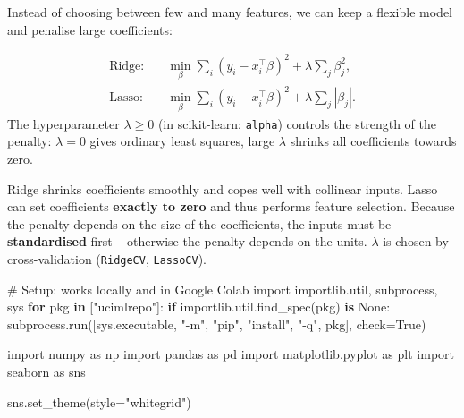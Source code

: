 \documentclass[
  letterpaper,
  DIV=11,
  numbers=noendperiod]{scrreprt}
\newenvironment{Shaded}{\begin{snugshade}}{\end{snugshade}}
\newcommand{\CommentTok}[1]{\textcolor[rgb]{0.37,0.37,0.37}{#1}}
\newcommand{\ControlFlowTok}[1]{\textcolor[rgb]{0.00,0.23,0.31}{\textbf{#1}}}
\newcommand{\ImportTok}[1]{\textcolor[rgb]{0.00,0.46,0.62}{#1}}
\newcommand{\KeywordTok}[1]{\textcolor[rgb]{0.00,0.23,0.31}{\textbf{#1}}}
\newcommand{\NormalTok}[1]{\textcolor[rgb]{0.00,0.23,0.31}{#1}}
\newcommand{\OperatorTok}[1]{\textcolor[rgb]{0.37,0.37,0.37}{#1}}
\newcommand{\StringTok}[1]{\textcolor[rgb]{0.13,0.47,0.30}{#1}}
\newcommand{\VariableTok}[1]{\textcolor[rgb]{0.07,0.07,0.07}{#1}}
\begin{document}
Instead of choosing between few and many features, we can keep a
flexible model and penalise large coefficients:

\begin{tcolorbox}[enhanced jigsaw, left=2mm, title=\textcolor{quarto-callout-note-color}{\faInfo}\hspace{0.5em}{Definition: Ridge and Lasso regression}, opacityback=0, breakable, rightrule=.15mm, arc=.35mm, toptitle=1mm, colbacktitle=quarto-callout-note-color!10!white, opacitybacktitle=0.6, coltitle=black, colframe=quarto-callout-note-color-frame, bottomrule=.15mm, leftrule=.75mm, bottomtitle=1mm, titlerule=0mm, toprule=.15mm, colback=white]

\[\begin{aligned} \text{Ridge:}&\quad \min_\beta \sum_i (y_i - x_i^\top\beta)^2 + \lambda \sum_j \beta_j^2, \\ \text{Lasso:}&\quad \min_\beta \sum_i (y_i - x_i^\top\beta)^2 + \lambda \sum_j |\beta_j|. \end{aligned}\]
The hyperparameter \(\lambda \ge 0\) (in scikit-learn: \texttt{alpha})
controls the strength of the penalty: \(\lambda = 0\) gives ordinary
least squares, large \(\lambda\) shrinks all coefficients towards zero.

\end{tcolorbox}

Ridge shrinks coefficients smoothly and copes well with collinear
inputs. Lasso can set coefficients \textbf{exactly to zero} and thus
performs feature selection. Because the penalty depends on the size of
the coefficients, the inputs must be \textbf{standardised} first --
otherwise the penalty depends on the units. \(\lambda\) is chosen by
cross-validation (\texttt{RidgeCV}, \texttt{LassoCV}).

\begin{Shaded}
\begin{Highlighting}[]
\CommentTok{\# Setup: works locally and in Google Colab}
\ImportTok{import}\NormalTok{ importlib.util, subprocess, sys}
\ControlFlowTok{for}\NormalTok{ pkg }\KeywordTok{in}\NormalTok{ [}\StringTok{"ucimlrepo"}\NormalTok{]:}
    \ControlFlowTok{if}\NormalTok{ importlib.util.find\_spec(pkg) }\KeywordTok{is} \VariableTok{None}\NormalTok{:}
\NormalTok{        subprocess.run([sys.executable, }\StringTok{"{-}m"}\NormalTok{, }\StringTok{"pip"}\NormalTok{, }\StringTok{"install"}\NormalTok{, }\StringTok{"{-}q"}\NormalTok{, pkg], check}\OperatorTok{=}\VariableTok{True}\NormalTok{)}

\ImportTok{import}\NormalTok{ numpy }\ImportTok{as}\NormalTok{ np}
\ImportTok{import}\NormalTok{ pandas }\ImportTok{as}\NormalTok{ pd}
\ImportTok{import}\NormalTok{ matplotlib.pyplot }\ImportTok{as}\NormalTok{ plt}
\ImportTok{import}\NormalTok{ seaborn }\ImportTok{as}\NormalTok{ sns}

\NormalTok{sns.set\_theme(style}\OperatorTok{=}\StringTok{"whitegrid"}\NormalTok{)}
\end{Highlighting}
\end{Shaded}
\end{document}
